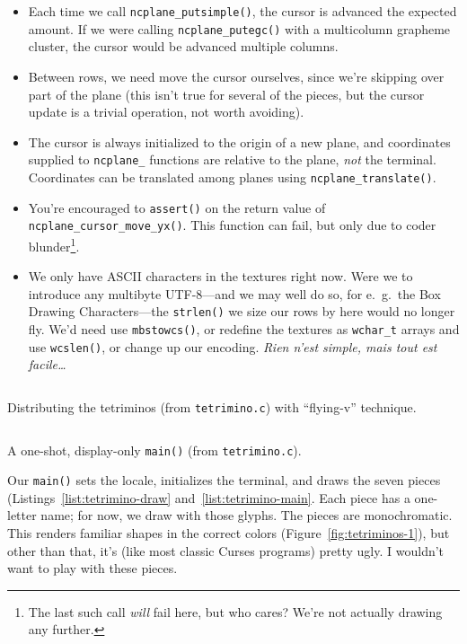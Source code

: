 \documentclass[letterpaper,10pt]{article}
\newenvironment{denseitemize}{
  \begin{itemize}
      \setlength{\itemsep}{0pt}
}{
  \end{itemize}
}
\begin{document}
\begin{denseitemize}
\item{Each time we call \texttt{ncplane\_putsimple()}, the cursor is advanced
      the expected amount. If we were calling \texttt{ncplane\_putegc()} with
      a multicolumn grapheme cluster, the cursor would be advanced multiple
      columns.}
\item{Between rows, we need move the cursor ourselves, since we're skipping over
      part of the plane (this isn't true for several of the pieces, but the
      cursor update is a trivial operation, not worth avoiding).}
\item{The cursor is always initialized to the origin of a new plane, and coordinates
      supplied to \texttt{ncplane\_} functions are relative to the plane,
      \textit{not} the terminal. Coordinates can be translated among planes
      using \texttt{ncplane\_translate()}.}
\item{You're encouraged to \texttt{assert()} on the return value of
      \texttt{ncplane\_cursor\_move\_yx()}. This function can fail, but
      only due to coder blunder\footnote{The last such call \textit{will} fail
        here, but who cares? We're not actually drawing any further.}.}
\item{We only have ASCII characters in the textures right now. Were we to
      introduce any multibyte UTF-8---and we may well do so, for e.\ g.\ the
      Box Drawing Characters---the \texttt{strlen()} we size our rows by here
      would no longer fly. We'd need use \texttt{mbstowcs()}, or redefine the
      textures as \texttt{wchar\_t} arrays and use \texttt{wcslen()},
      or change up our encoding. \textfrench{\textit{Rien n'est simple, mais tout est facile\ldots}}}
\end{denseitemize}

\begin{listing}[!htbp]
\inputminted[]{C}{code/tetrimino-draw.h}
\caption{Distributing the tetriminos (from \texttt{tetrimino.c}) with ``flying-v'' technique.}
\label{list:tetrimino-draw}
\end{listing}

\begin{listing}[!htbp]
\inputminted[]{C}{code/tetrimino-main.h}
\caption{A one-shot, display-only \texttt{main()} (from \texttt{tetrimino.c}).}
\label{list:tetrimino-main}
\end{listing}

Our \texttt{main()} sets the locale, initializes the terminal, and draws the
seven pieces (Listings~\ref{list:tetrimino-draw} and~\ref{list:tetrimino-main}.
Each piece has a one-letter name; for now, we draw with those glyphs. The
pieces are monochromatic. This renders familiar shapes in the correct colors
(Figure~\ref{fig:tetriminos-1}), but other than that, it's (like most classic
Curses programs) pretty ugly. I wouldn't want to play with these pieces.
\end{document}
